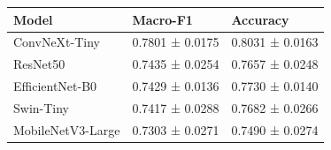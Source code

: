 \begin{tabular}{lll}
\toprule
Model & Macro-F1 & Accuracy \\
\midrule
ConvNeXt-Tiny & 0.7801 ± 0.0175 & 0.8031 ± 0.0163 \\
ResNet50 & 0.7435 ± 0.0254 & 0.7657 ± 0.0248 \\
EfficientNet-B0 & 0.7429 ± 0.0136 & 0.7730 ± 0.0140 \\
Swin-Tiny & 0.7417 ± 0.0288 & 0.7682 ± 0.0266 \\
MobileNetV3-Large & 0.7303 ± 0.0271 & 0.7490 ± 0.0274 \\
\bottomrule
\end{tabular}
